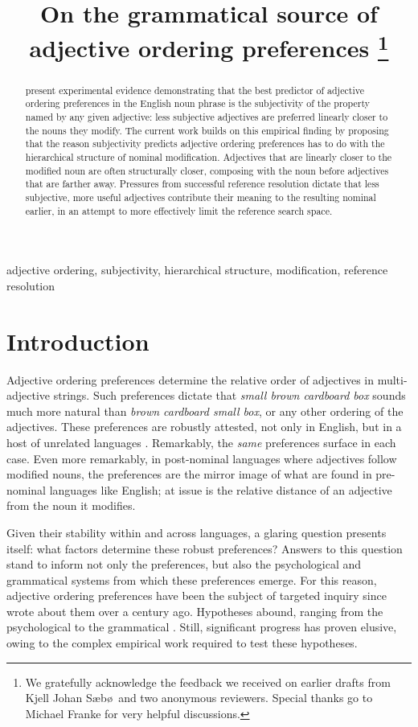\documentclass{sp}
\title[On the grammatical source of adjective ordering preferences]{On the grammatical source of adjective ordering preferences%
	\thanks{We gratefully acknowledge the feedback we received on earlier drafts from Kjell Johan S\ae b\o\  and two anonymous reviewers. Special thanks go to Michael Franke for very helpful discussions.}}
\author[Scontras, Degen, Goodman]{%
	\spauthor{Gregory Scontras \\ \institute{University of California, Irvine}} \AND
	\spauthor{Judith Degen \\ \institute{Stanford University}} \AND
	\spauthor{Noah D. Goodman \\ \institute{Stanford University}}}
\begin{document}
\maketitle

\begin{abstract}
	\cite{scontrasetal2017adjectives} present experimental evidence demonstrating that the best predictor of adjective ordering preferences in the English noun phrase is the subjectivity of the property named by any given adjective: less subjective adjectives are preferred linearly closer to the nouns they modify. The current work builds on this empirical finding by proposing that the reason subjectivity predicts adjective ordering preferences has to do with the hierarchical structure of nominal modification. Adjectives that are linearly closer to the modified noun are often structurally closer, composing with the noun before adjectives that are farther away. Pressures from successful reference resolution dictate that less subjective, more useful adjectives contribute their meaning to the resulting nominal earlier, in an attempt to more effectively limit the reference search space.
\end{abstract}

\begin{keywords}
	adjective ordering, subjectivity, hierarchical structure, modification, reference resolution
\end{keywords}

\section{Introduction}

Adjective ordering preferences determine the relative order of adjectives in multi-adjective strings. Such preferences dictate that \emph{small brown cardboard box} sounds much more natural than \emph{brown cardboard small box}, or any other ordering of the adjectives. 
These preferences are robustly attested, not only in English, but in a host of unrelated languages \citep[see, among others,][]{dixon1982}. Remarkably, the \emph{same} preferences surface in each case. Even more remarkably, in post-nominal languages where adjectives follow modified nouns, the preferences are the mirror image of what are found in pre-nominal languages like English; %
at issue is the relative distance of an adjective from the noun it modifies.

Given their stability within and across languages, a glaring question presents itself: what factors determine these robust preferences? Answers to this question stand to inform not only the preferences, but also the psychological and grammatical systems from which these preferences emerge. For this reason, adjective ordering preferences have been the subject of targeted inquiry since \cite{sweet1898} wrote about them over a century ago. Hypotheses abound, ranging from the psychological \citep[e.g.,][]{whorf1945,martin1969} to the grammatical \citep[e.g.,][]{cinque1994,mcnallyboleda2004,truswell2009}. Still, significant progress has proven elusive, owing to the complex empirical work required to test these hypotheses.
\end{document}
